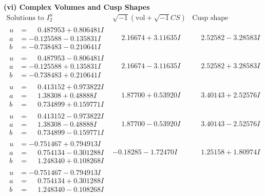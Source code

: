 \documentclass[1p]{elsarticle_modified}
\theoremstyle{definition}
\newcommand{\I}{\sqrt{-1}}
\begin{document}
\newpage\flushleft \textbf{(vi) Complex Volumes and Cusp Shapes}
$$\begin{array}{c|c|c}  
\text{Solutions to }I^u_{2}& \I (\text{vol} + \sqrt{-1}CS) & \text{Cusp shape}\\
 \hline 
\begin{aligned}
u &= \phantom{-}0.487953 + 0.806481 I \\
a &= -0.125588 - 0.135831 I \\
b &= -0.738483 - 0.210641 I\end{aligned}
 & \phantom{-}2.16674 + 3.11635 I & \phantom{-}2.52582 - 3.28583 I \\ \hline\begin{aligned}
u &= \phantom{-}0.487953 - 0.806481 I \\
a &= -0.125588 + 0.135831 I \\
b &= -0.738483 + 0.210641 I\end{aligned}
 & \phantom{-}2.16674 - 3.11635 I & \phantom{-}2.52582 + 3.28583 I \\ \hline\begin{aligned}
u &= \phantom{-}0.413152 + 0.973822 I \\
a &= \phantom{-}1.38308 + 0.48888 I \\
b &= \phantom{-}0.734899 + 0.159771 I\end{aligned}
 & \phantom{-}1.87700 + 0.53920 I & \phantom{-}3.40143 + 2.52576 I \\ \hline\begin{aligned}
u &= \phantom{-}0.413152 - 0.973822 I \\
a &= \phantom{-}1.38308 - 0.48888 I \\
b &= \phantom{-}0.734899 - 0.159771 I\end{aligned}
 & \phantom{-}1.87700 - 0.53920 I & \phantom{-}3.40143 - 2.52576 I \\ \hline\begin{aligned}
u &= -0.751467 + 0.794913 I \\
a &= \phantom{-}0.754134 - 0.301288 I \\
b &= \phantom{-}1.248340 + 0.108268 I\end{aligned}
 & -0.18285 - 1.72470 I & \phantom{-}1.25158 + 1.80974 I \\ \hline\begin{aligned}
u &= -0.751467 - 0.794913 I \\
a &= \phantom{-}0.754134 + 0.301288 I \\
b &= \phantom{-}1.248340 - 0.108268 I\end{aligned}

\end{array}$$
\end{document}
